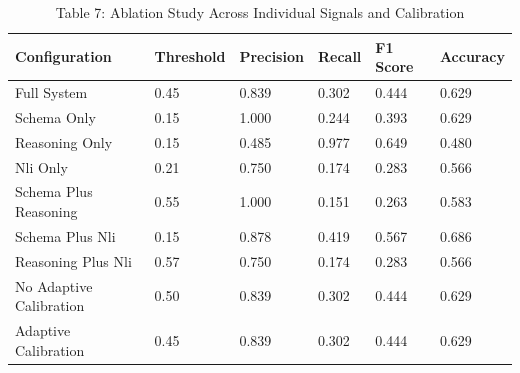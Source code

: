 \begin{table}
\caption{Table 7: Ablation Study Across Individual Signals and Calibration}
\label{tab:table7_ablation_results}
\begin{tabular}{llllll}
\toprule
Configuration & Threshold & Precision & Recall & F1 Score & Accuracy \\
\midrule
Full System & 0.45 & 0.839 & 0.302 & 0.444 & 0.629 \\
Schema Only & 0.15 & 1.000 & 0.244 & 0.393 & 0.629 \\
Reasoning Only & 0.15 & 0.485 & 0.977 & 0.649 & 0.480 \\
Nli Only & 0.21 & 0.750 & 0.174 & 0.283 & 0.566 \\
Schema Plus Reasoning & 0.55 & 1.000 & 0.151 & 0.263 & 0.583 \\
Schema Plus Nli & 0.15 & 0.878 & 0.419 & 0.567 & 0.686 \\
Reasoning Plus Nli & 0.57 & 0.750 & 0.174 & 0.283 & 0.566 \\
No Adaptive Calibration & 0.50 & 0.839 & 0.302 & 0.444 & 0.629 \\
Adaptive Calibration & 0.45 & 0.839 & 0.302 & 0.444 & 0.629 \\
\bottomrule
\end{tabular}
\end{table}
